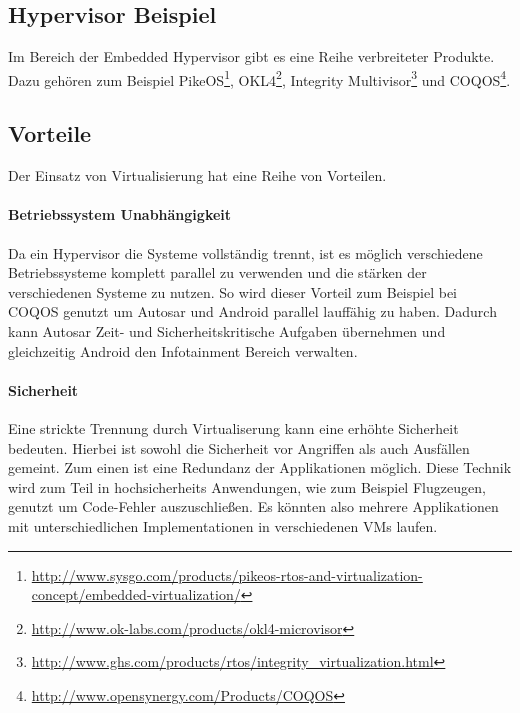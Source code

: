 \documentclass[
  a4paper,					    %
  twoside,
  DIV=calc,     				%
  bibliography=totoc,
  cleardoublepage=empty,
  ngerman,     					%
  final       					%
]{scrbook}
\begin{document}
\subsection{Hypervisor Beispiel}
Im Bereich der Embedded Hypervisor gibt es eine Reihe verbreiteter Produkte. Dazu gehören zum Beispiel PikeOS\footnote{\url{http://www.sysgo.com/products/pikeos-rtos-and-virtualization-concept/embedded-virtualization/}}, OKL4\footnote{\url{http://www.ok-labs.com/products/okl4-microvisor}}, Integrity Multivisor\footnote{\url{http://www.ghs.com/products/rtos/integrity_virtualization.html}} und COQOS\footnote{\url{http://www.opensynergy.com/Products/COQOS}}.





\subsection{Vorteile}
Der Einsatz von Virtualisierung hat eine Reihe von Vorteilen\cite{wiki:emb_hyp}.

\paragraph{Betriebssystem Unabhängigkeit}
Da ein Hypervisor die Systeme vollständig trennt, ist es möglich verschiedene Betriebssysteme komplett parallel zu verwenden und die stärken der verschiedenen Systeme zu nutzen. So wird dieser Vorteil zum Beispiel bei COQOS genutzt um Autosar und Android parallel lauffähig zu haben. Dadurch kann Autosar Zeit- und Sicherheitskritische Aufgaben übernehmen und gleichzeitig Android den Infotainment Bereich verwalten.

\paragraph{Sicherheit}
Eine strickte Trennung durch Virtualiserung kann eine erhöhte Sicherheit bedeuten. Hierbei ist sowohl die Sicherheit vor Angriffen als auch Ausfällen gemeint. Zum einen ist eine Redundanz der Applikationen möglich. Diese Technik wird zum Teil in hochsicherheits Anwendungen, wie zum Beispiel Flugzeugen, genutzt um Code-Fehler auszuschließen. Es könnten also mehrere Applikationen mit unterschiedlichen Implementationen in verschiedenen VMs laufen.
\end{document}
